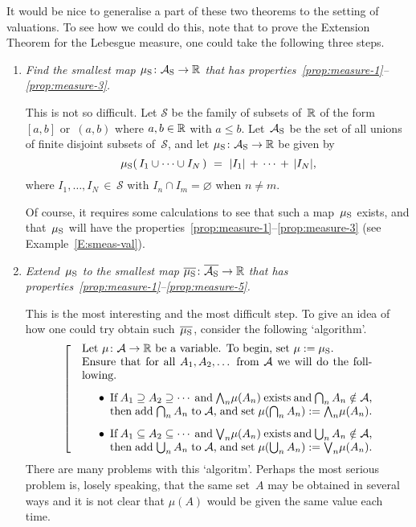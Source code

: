 \documentclass[main.tex]{subfiles}
\begin{document}
It would be nice
to generalise a
part of these two theorems
to the setting of valuations.
To see how we could do this,
note that to prove
the Extension Theorem for the Lebesgue measure,
one could take the following three steps.
\begin{enumerate}
\item
\label{extension-step-1}
\emph{Find the smallest map $\mu_{\mathrm{S}}\colon \mathcal{A}_{\mathrm{S}}\rightarrow \mathbb{R}$
that has properties~\ref{prop:measure-1}--\ref{prop:measure-3}.}

This is not so difficult.
Let $\mathcal{S}$ be the family of subsets of~$\mathbb{R}$ of
the form~$[a,b]$ or~$(a,b)$ where $a,b\in \mathbb{R}$ with $a\leq b$.
Let~$\mathcal{A}_{\mathrm{S}}$ be the set of all unions
of finite disjoint subsets of~$\mathcal{S}$,
and let $\mu_{\mathrm{S}}\colon \mathcal{A}_{\mathrm{S}}\rightarrow \mathbb{R}$
be given by
\begin{equation*}
\Smu(\,I_1 \cup\dotsb\cup I_N\,) \ = \ |I_1| \,+\,\dotsb\,+\,|I_N|,
\end{equation*}
where $I_1,\dotsc,I_N\,\in\, \mathcal{S}$
with $I_n\cap I_m = \varnothing$ when $n\neq m$.

Of course, it requires some calculations
to see that such a map~$\mu_{\mathrm{S}}$ exists,
and that~$\mu_{\mathrm{S}}$ will have the 
properties~\ref{prop:measure-1}--\ref{prop:measure-3}
(see Example~\ref{E:smeas-val}).

\item
\label{extension-step-2}
\emph{Extend~$\mu_{\mathrm{S}}$
to the smallest map $\overline{\mu_{\mathrm{S}}}\colon\overline{\mathcal{A}_{\mathrm{S}}}\rightarrow\mathbb{R}$
that has properties~\ref{prop:measure-1}--\ref{prop:measure-5}.}

This is the most interesting and the most difficult step.
To give an idea of how one could try obtain such~$\overline{\mu_{\mathrm{S}}}$,
consider the following `algorithm'.
\begin{equation*}
\left[\quad
\begin{minipage}{.75\columnwidth}
Let $\mu\colon\mathcal{A} \ra \R$
be a variable. To begin, set $\mu \eqdf \Smu$.\\
Ensure that for all~$A_1,A_2,\dotsc$ from~$\mathcal{A}$ 
we will do the folllowing.
\begin{enumerate}
\item[$\bullet$] If $A_1 \supseteq A_2 \supseteq \dotsb$
and  $\bw_n \mu(A_n)$ exists
and  $\bigcap_n A_n \notin \mathcal{A}$,\\
then add $\bigcap_n A_n$ to~$\mathcal{A}$,
and set $\mu(\bigcap_n A_n) \eqdf \bw_n \mu(A_n)$.
\item[$\bullet$] If $A_1 \subseteq A_2 \subseteq \dotsb$
and  $\bv_n \mu(A_n)$ exists
and  $\bigcup_n A_n \notin \mathcal{A}$,\\
then add $\bigcup_n A_n$ to~$\mathcal{A}$,
and set $\mu(\bigcup_n A_n) \eqdf \bv_n \mu(A_n)$.
\end{enumerate}
\end{minipage}
\right.
\end{equation*}
There are many problems with this `algoritm'.
Perhaps the most serious problem
is, losely speaking, that the same set~$A$ may be obtained
in several ways
and it is not clear that
$\mu(A)$ would be given the same value each time.


\end{enumerate}
\end{document}

